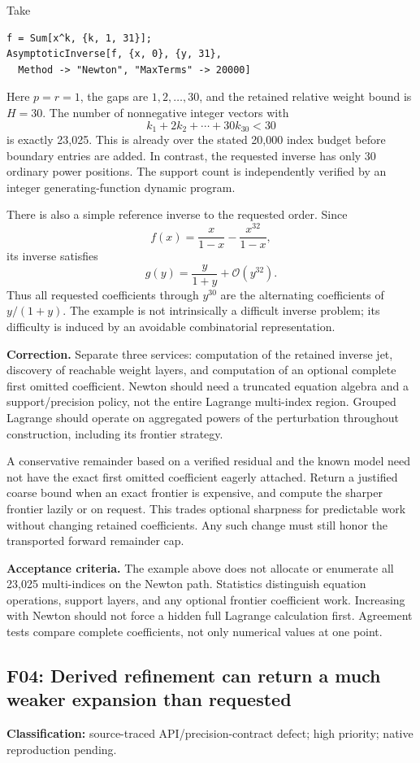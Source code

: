 \documentclass[11pt,a4paper]{article}
\newcommand{\code}[1]{\texttt{\detokenize{#1}}}
\newcommand{\OO}{\mathcal O}
\newcommand{\finding}[3]{\subsection{#1: #2}\label{finding:#1}\textbf{Classification:} #3.\par}
\theoremstyle{definition}
\begin{document}
Take
\begin{lstlisting}
f = Sum[x^k, {k, 1, 31}];
AsymptoticInverse[f, {x, 0}, {y, 31},
  Method -> "Newton", "MaxTerms" -> 20000]
\end{lstlisting}
Here $p=r=1$, the gaps are $1,2,\ldots,30$, and the retained relative weight bound is $H=30$. The number of nonnegative integer vectors with
\[
 k_1+2k_2+\cdots+30k_{30}<30
\]
is exactly 23,025. This is already over the stated 20,000 index budget before boundary entries are added. In contrast, the requested inverse has only 30 ordinary power positions. The support count is independently verified by an integer generating-function dynamic program.

There is also a simple reference inverse to the requested order. Since
\[
 f(x)=\frac{x}{1-x}-\frac{x^{32}}{1-x},
\]
its inverse satisfies
\[
 g(y)=\frac{y}{1+y}+\OO(y^{32}).
\]
Thus all requested coefficients through $y^{30}$ are the alternating coefficients of $y/(1+y)$. The example is not intrinsically a difficult inverse problem; its difficulty is induced by an avoidable combinatorial representation.

\textbf{Correction.} Separate three services: computation of the retained inverse jet, discovery of reachable weight layers, and computation of an optional complete first omitted coefficient. Newton should need a truncated equation algebra and a support/precision policy, not the entire Lagrange multi-index region. Grouped Lagrange should operate on aggregated powers of the perturbation throughout construction, including its frontier strategy.

A conservative remainder based on a verified residual and the known model need not have the exact first omitted coefficient eagerly attached. Return a justified coarse bound when an exact frontier is expensive, and compute the sharper frontier lazily or on request. This trades optional sharpness for predictable work without changing retained coefficients. Any such change must still honor the transported forward remainder cap.

\textbf{Acceptance criteria.} The example above does not allocate or enumerate all 23,025 multi-indices on the Newton path. Statistics distinguish equation operations, support layers, and any optional frontier coefficient work. Increasing \code{SeriesTermGoal} with Newton should not force a hidden full Lagrange calculation first. Agreement tests compare complete coefficients, not only numerical values at one point.

\finding{F04}{Derived refinement can return a much weaker expansion than requested}{source-traced API/precision-contract defect; high priority; native reproduction pending}
\end{document}
